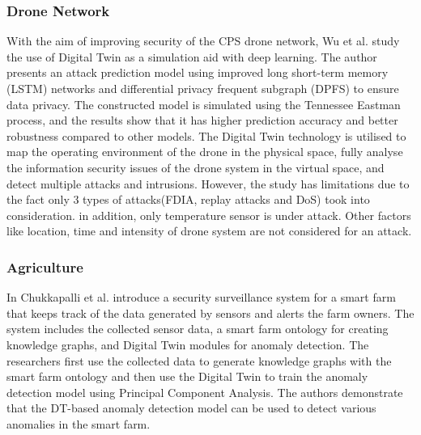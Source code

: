 \subsubsection*{Drone Network}
With the aim of improving security of the CPS drone network, Wu et al.\cite{wuDeepLearningDriven2022} study the use of Digital Twin as a simulation aid with deep learning.  
The author presents an attack prediction model  using improved long short-term memory (LSTM) networks and differential privacy frequent subgraph (DPFS) to ensure data privacy. The constructed model is simulated using the Tennessee Eastman process, and the results show that it has higher prediction accuracy and better robustness compared to other models. The Digital Twin technology is utilised to map the operating environment of the drone in the physical space, fully analyse the information security issues of the drone system in the virtual space, and detect multiple attacks and intrusions. However, the study has limitations due to the fact only 3 types of attacks(FDIA, replay attacks and DoS) took into consideration. in addition, only temperature sensor is under attack. Other factors like location, time and intensity of drone system are not considered for an attack.


\subsubsection*{Agriculture}
In\cite{chukkapalliCyberPhysicalSystemSecurity2021} Chukkapalli et al. introduce a security surveillance system for a smart farm that keeps track of the data generated by sensors and alerts the farm owners. The system includes the collected sensor data, a smart farm ontology for creating knowledge graphs, and Digital Twin modules for anomaly detection. The researchers first use the collected data to generate knowledge graphs with the smart farm ontology and then use the Digital Twin to train the anomaly detection model using Principal Component Analysis. The authors demonstrate that the DT-based anomaly detection model can be used to detect various anomalies in the smart farm.

